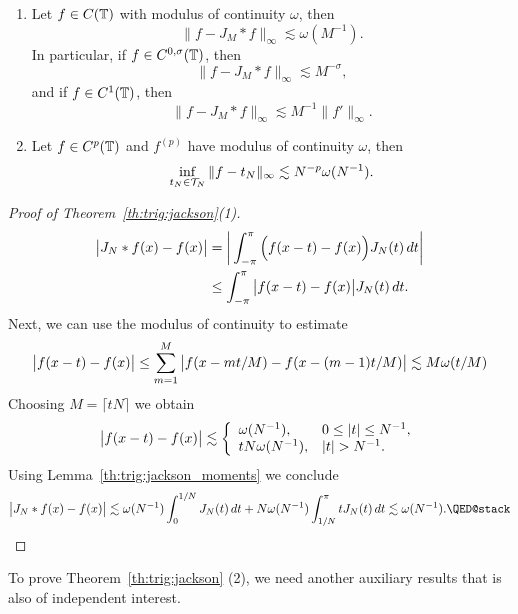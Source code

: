 \begin{theorem} \label{th:trig:jackson}
  \begin{enumerate}
  \item Let $f \in C(\mathbb{T})$ with modulus of continuity $\omega$, then
  \[
      \| f - J_M \ast f \|_\infty \lesssim \omega(M^{-1}).
  \]
  In particular, if $f \in C^{0,\sigma}(\mathbb{T})$, then
  \[
      \|f - J_M \ast f \|_\infty \lesssim M^{-\sigma},
  \]
  and if $f \in C^1(\mathbb{T})$, then
  \begin{equation} \label{eq:trig:jackson:C1-version}
    \|f - J_M \ast f \|_\infty \lesssim M^{-1} \|f'\|_\infty.
  \end{equation}
  \item Let $f \in C^p(\mathbb{T})$ and $f^{(p)}$ have modulus of continuity $\omega$,
  then
  \[
      \inf_{t_N \in \mathcal{T}_N} \| f - t_N \|_\infty
        \lesssim N^{-p} \omega(N^{-1}).
  \]
  \end{enumerate}
\end{theorem}
\begin{proof}[Proof of Theorem~\ref{th:trig:jackson}(1)]
  \begin{align*}
    \big| J_N \ast f(x) - f(x) \big|
    &=
    \bigg| \int_{-\pi}^\pi \Big( f(x-t) - f(x) \Big) J_N(t) \, dt \bigg| \\
    &\leq
    \int_{-\pi}^\pi \big|f(x-t) - f(x) \big| J_N(t) \, dt.
  \end{align*}
  Next, we can use the modulus of continuity to estimate
  \[
    \big|f(x-t) - f(x) \big| \leq \sum_{m = 1}^M
      \big| f(x - mt/M) - f(x - (m-1)t/M) \big|
    \lesssim M \omega(t/M)
  \]
  Choosing $M = \lceil tN \rceil$ we obtain
  \[
    \big|f(x-t) - f(x) \big| \lesssim
      \left\{ \begin{array}{ll} 
        \omega(N^{-1}), & 0 \leq |t| \leq N^{-1}, \\
        t N \omega(N^{-1}), & |t| > N^{-1}.
       \end{array} \right.
  \]
  Using Lemma~\ref{th:trig:jackson_moments} we conclude
  \[
    \b| J_N \ast f(x) - f(x) \b|
    \lesssim
      \omega(N^{-1}) \int_0^{1/N} J_N(t) \, dt
      + N \omega(N^{-1}) \int_{1/N}^{\pi} t J_N(t)\, dt
    \lesssim \omega(N^{-1}). \qedhere
  \]
\end{proof}


To prove Theorem~\ref{th:trig:jackson} (2), we need another auxiliary
results that is also of independent interest.

